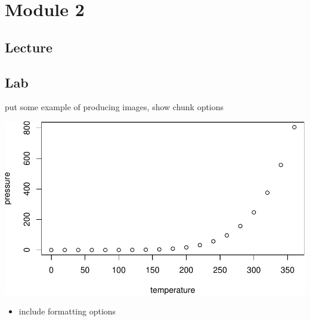 \documentclass[
]{book}
\providecommand{\tightlist}{%
  \setlength{\itemsep}{0pt}\setlength{\parskip}{0pt}}
\begin{document}
\chapter{Module 2}\label{module-2}

\section{Lecture}\label{lecture-1}

\section{Lab}\label{lab-1}

put some example of producing images, show chunk options

\includegraphics{_main_files/figure-latex/pressure-plot-1.pdf}

\begin{itemize}
\tightlist
\item
  include formatting options
\end{itemize}

  
\end{document}
